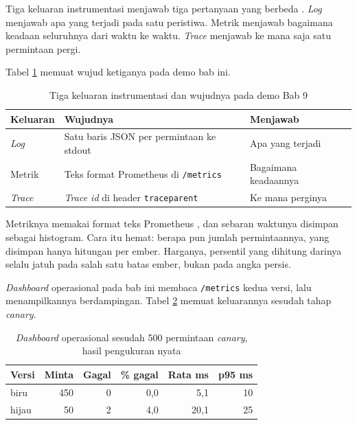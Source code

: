 Tiga keluaran instrumentasi menjawab tiga pertanyaan yang berbeda
\cite{otel-docs}. \textit{Log} menjawab apa yang terjadi pada satu peristiwa.
Metrik menjawab bagaimana keadaan seluruhnya dari waktu ke waktu.
\textit{Trace} menjawab ke mana saja satu permintaan pergi.

Tabel \ref{tab:tiga-pilar} memuat wujud ketiganya pada demo bab ini.

\begin{table}[!htb]
  \centering
  \caption{Tiga keluaran instrumentasi dan wujudnya pada demo Bab 9}
  \label{tab:tiga-pilar}
  \begin{tabularx}{\textwidth}{lXl}
    \hline
    \textbf{Keluaran} & \textbf{Wujudnya} & \textbf{Menjawab} \\
    \hline
    \textit{Log} & Satu baris JSON per permintaan ke stdout & Apa yang terjadi \\
    \hline
    Metrik & Teks format Prometheus di \texttt{/metrics} & Bagaimana keadaannya \\
    \hline
    \textit{Trace} & \textit{Trace id} di header \texttt{traceparent} & Ke mana perginya \\
    \hline
  \end{tabularx}
\end{table}

Metriknya memakai format teks Prometheus \cite{prometheus-exposition}, dan
sebaran waktunya disimpan sebagai histogram. Cara itu hemat: berapa pun
jumlah permintaannya, yang disimpan hanya hitungan per ember. Harganya,
persentil yang dihitung darinya selalu jatuh pada salah satu batas ember,
bukan pada angka persis.

\textit{Dashboard} operasional pada bab ini membaca \texttt{/metrics} kedua versi, lalu
menampilkannya berdampingan. Tabel \ref{tab:dashboard} memuat keluarannya sesudah
tahap \textit{canary}.

\begin{table}[!htb]
  \centering
  \caption{\textit{Dashboard} operasional sesudah 500 permintaan \textit{canary}, hasil
           pengukuran nyata}
  \label{tab:dashboard}
  \begin{tabularx}{\textwidth}{Xrrrrr}
    \hline
    \textbf{Versi} & \textbf{Minta} & \textbf{Gagal} & \textbf{\% gagal} & \textbf{Rata ms} & \textbf{p95 ms} \\
    \hline
    biru & 450 & 0 & 0,0 & 5,1 & 10 \\
    \hline
    hijau & 50 & 2 & 4,0 & 20,1 & 25 \\
    \hline
  \end{tabularx}
\end{table}

